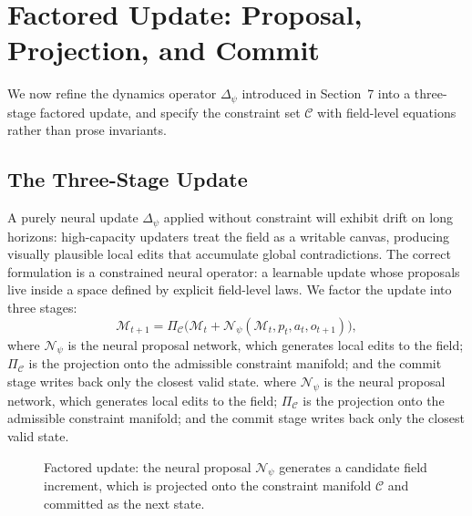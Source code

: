 \documentclass[11pt]{article}
\begin{document}
\section{Factored Update: Proposal, Projection, and Commit}
\label{sec:factored}

We now refine the dynamics operator $\Delta_\psi$ introduced in
Section~7 into a three-stage factored update, and specify the constraint
set $\mathcal{C}$ with field-level equations rather than prose invariants.

\subsection{The Three-Stage Update}

A purely neural update $\Delta_\psi$ applied without constraint will
exhibit drift on long horizons: high-capacity updaters treat the field as
a writable canvas, producing visually plausible local edits that accumulate
global contradictions.
The correct formulation is a constrained neural operator: a learnable
update whose proposals live inside a space defined by explicit field-level
laws.
We factor the update into three stages:
\[
\mathcal{M}_{t+1}
=
\Pi_{\mathcal{C}}\!\Big(
\mathcal{M}_t
+
\mathcal{N}_\psi(\mathcal{M}_t, p_t, a_t, o_{t+1})
\Big),
\]
where $\mathcal{N}_\psi$ is the neural proposal network, which generates
local edits to the field; $\Pi_{\mathcal{C}}$ is the projection onto the
admissible constraint manifold; and the commit stage writes back only the
closest valid state.
where $\mathcal{N}_\psi$ is the neural proposal network, which generates
local edits to the field; $\Pi_{\mathcal{C}}$ is the projection onto the
admissible constraint manifold; and the commit stage writes back only the
closest valid state.

\begin{figure}[h]
\centering
{}
\caption{Factored update: the neural proposal $\mathcal{N}_\psi$ generates
a candidate field increment, which is projected onto the constraint
manifold $\mathcal{C}$ and committed as the next state.}
\end{figure}
\end{document}
